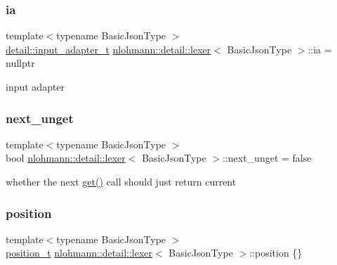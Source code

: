 \subsubsection{\texorpdfstring{ia}{ia}}
{\footnotesize\ttfamily template$<$typename Basic\+Json\+Type $>$ \\
\hyperlink{namespacenlohmann_1_1detail_ae132f8cd5bb24c5e9b40ad0eafedf1c2}{detail\+::input\+\_\+adapter\+\_\+t} \hyperlink{classnlohmann_1_1detail_1_1lexer}{nlohmann\+::detail\+::lexer}$<$ Basic\+Json\+Type $>$\+::ia = nullptr\hspace{0.3cm}{\ttfamily [private]}}



input adapter 

\mbox{\label{classnlohmann_1_1detail_1_1lexer_ae8bedb97b907ba6347c5b2f2666ca01f}} 
\subsubsection{\texorpdfstring{next\+\_\+unget}{next\_unget}}
{\footnotesize\ttfamily template$<$typename Basic\+Json\+Type $>$ \\
bool \hyperlink{classnlohmann_1_1detail_1_1lexer}{nlohmann\+::detail\+::lexer}$<$ Basic\+Json\+Type $>$\+::next\+\_\+unget = false\hspace{0.3cm}{\ttfamily [private]}}



whether the next \hyperlink{classnlohmann_1_1detail_1_1lexer_a901e45a34e1fb1d97ab62350b0c3ef26}{get()} call should just return current 

\mbox{\label{classnlohmann_1_1detail_1_1lexer_a932a1b4133619f08fc7442b52368385e}} 
\subsubsection{\texorpdfstring{position}{position}}
{\footnotesize\ttfamily template$<$typename Basic\+Json\+Type $>$ \\
\hyperlink{structnlohmann_1_1detail_1_1position__t}{position\+\_\+t} \hyperlink{classnlohmann_1_1detail_1_1lexer}{nlohmann\+::detail\+::lexer}$<$ Basic\+Json\+Type $>$\+::position \{\}\hspace{0.3cm}{\ttfamily [private]}}



